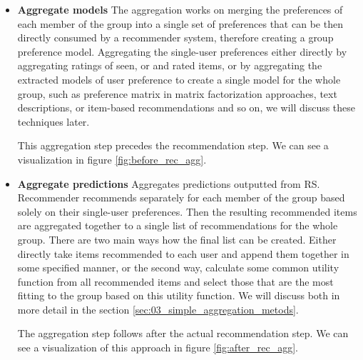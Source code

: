 \begin{itemize}
    \item \textbf{Aggregate models} \newline
    The aggregation works on merging the preferences of each member of the group into a single set of preferences that can be then directly consumed by a recommender system, therefore creating a group preference model. Aggregating the single-user preferences either directly by aggregating ratings of seen, or and rated items, or by aggregating the extracted models of user preference to create a single model for the whole group, such as preference matrix in matrix factorization approaches, text descriptions, or item-based recommendations and so on, we will discuss these techniques later.
    
    
    This aggregation step precedes the recommendation step. We can see a visualization in figure \ref{fig:before_rec_agg}.
    
    
    \item \textbf{Aggregate predictions} \newline
     Aggregates predictions outputted from RS. Recommender recommends separately for each member of the group based solely on their single-user preferences. Then the resulting recommended items are aggregated together to a single list of recommendations for the whole group. There are two main ways how the final list can be created. Either directly take items recommended to each user and append them together in some specified manner, or the second way, calculate some common utility function from all recommended items and select those that are the most fitting to the group based on this utility function. We will discuss both in more detail in the section \ref{sec:03_simple_aggregation_metods}.
     
     The aggregation step follows after the actual recommendation step. We can see a visualization of this approach in figure \ref{fig:after_rec_agg}.
     

\end{itemize}
